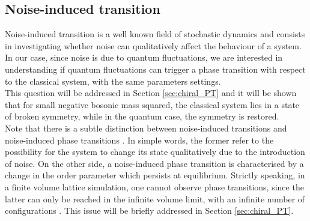 \subsection{Noise-induced transition}
Noise-induced transition is a well known field of stochastic dynamics \cite{gardiner,noiseinduced} and consists in investigating
whether noise can qualitatively affect the behaviour of a system. In our case, since noise is due to quantum fluctuations, we are interested in understanding if quantum fluctuations can trigger a phase transition with respect to the classical system, with the same parameters settings. \\
This question will be addressed in Section \ref{sec:chiral_PT} and it will be shown that for small negative bosonic mass squared, the classical system lies in a state of broken symmetry, while in the quantum case, the symmetry is restored. \\
Note that there is a subtle distinction between noise-induced transitions and noise-induced phase transitions \cite{noiseinduced_2}. In simple words, the former refer to the possibility for the system to change its state qualitatively due to the introduction of noise. On the other side, a noise-induced phase transition is characterised by a change in the order parameter which persists at equilibrium. 
Strictly speaking, in a finite volume lattice simulation, one cannot observe phase transitions, since the latter 
can only be reached in the infinite volume limit, with an infinite number of configurations \cite{friedli_velenik_2017}. This issue will be briefly addressed in Section \ref{sec:chiral_PT}.

